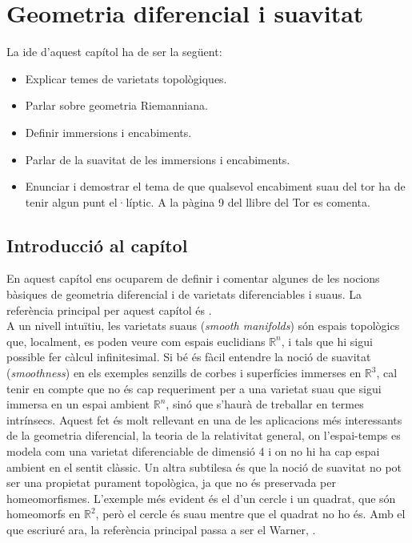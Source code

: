 \chapter{Geometria diferencial i suavitat}


{\color{blue} La ide d'aquest capítol ha de ser la següent:
\begin{itemize}
    \item Explicar temes de varietats topològiques.
    \item Parlar sobre geometria Riemanniana.
    \item Definir immersions i encabiments.
    \item Parlar de la suavitat de les immersions i encabiments.
    \item Enunciar i demostrar el tema de que qualsevol encabiment suau del tor ha de tenir algun punt el·líptic. A la pàgina 9 del llibre del Tor es comenta.

\end{itemize}
}


\section{Introducció al capítol}
En aquest capítol ens ocuparem de definir i comentar algunes de les nocions bàsiques de geometria diferencial i de varietats diferenciables i suaus. La referència principal per aquest capítol és \cite{lee2013}.\\
A un nivell intuïtiu, les varietats suaus (\textit{smooth manifolds}) són espais topològics que, localment, es poden veure com espais euclidians $\mathbb R^n$, i tals que hi sigui possible fer càlcul infinitesimal. Si bé és fàcil entendre la noció de suavitat (\textit{smoothness}) en els exemples senzills de corbes i superfícies immerses en $\mathbb R^3$, cal tenir en compte que no és cap requeriment per a una varietat suau que sigui immersa en un espai ambient $\mathbb R^n$, sinó que s'haurà de treballar en termes intrínsecs. Aquest fet és molt rellevant en una de les aplicacions més interessants de la geometria diferencial, la teoria de la relativitat general, on l'espai-temps es modela com una varietat diferenciable de dimensió 4 i on no hi ha cap espai ambient en el sentit clàssic. Un altra subtilesa és que la noció de suavitat no pot ser una propietat purament topològica, ja que no és preservada per homeomorfismes. L'exemple més evident és el d'un cercle i un quadrat, que són homeomorfs en $\mathbb R^2$, però el cercle és suau mentre que el quadrat no ho és.
{\color{blue} Amb el que escriuré ara, la referència principal passa a ser el Warner, \cite{warner1983}.}





